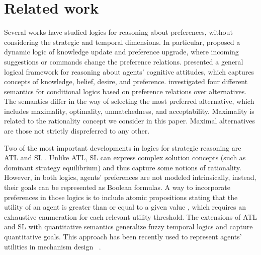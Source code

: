 \section{Related work}
\label{sec:relatedwork}


Several works have studied logics  for reasoning about preferences, without considering the strategic and temporal dimensions. In particular, \citeauthor{BenthemL07} \cite{BenthemL07} proposed a dynamic logic of knowledge update and preference upgrade, where incoming suggestions or commands change the preference relations. \citeauthor{Lorini21} \cite{Lorini21} presented a general logical framework for reasoning about agents’ cognitive
attitudes, which captures concepts of knowledge, belief, desire, and preference.  
\citeauthor{GrossiHK22} \cite{GrossiHK22} investigated four different semantics for conditional logics based on preference relations over alternatives. The semantics differ in the way of selecting the most preferred alternative, which includes maximality, optimality, unmatchedness, and acceptability. \ifarxiv Maximality is related to the rationality concept we consider in this paper. Maximal alternatives are those not strictly dispreferred to any other. \fi 

Two of the most important developments in logics for strategic reasoning are ATL \cite{alur2002alternating} and SL \cite{MogaveroMPV14}.
Unlike ATL, SL can express complex solution concepts (such as dominant strategy equilibrium) and thus capture some notions of rationality.  
However, in both logics, agents' preferences are not modeled intrinsically, instead, their goals can be represented as Boolean formulas. 
A way to incorporate preferences in those logics is to include atomic propositions stating that the utility of an agent is greater than or equal to a given value \cite{baltag2002logic}, which requires an exhaustive enumeration for each relevant utility threshold.  
The extensions of ATL and SL with quantitative semantics \cite{jamroga2024playing,bouyer2023reasoning} generalize fuzzy temporal logics and capture quantitative goals.  This approach has been recently used to represent agents' utilities in  mechanism design ~\cite{SLKF_KR21,MittelmannMMP22}. 

